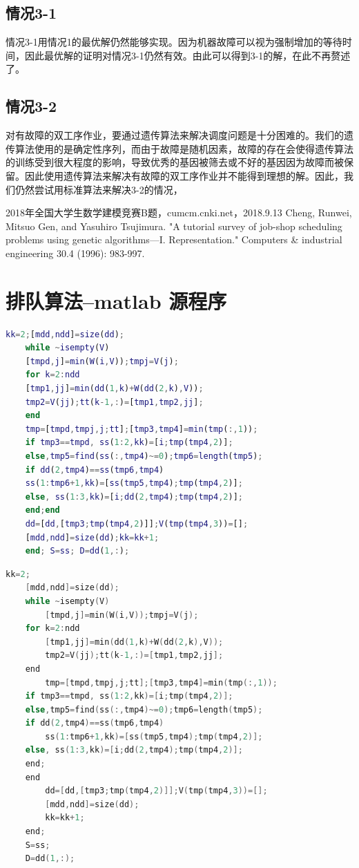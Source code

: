 \documentclass{cumcmthesis}
\begin{document}
	\subsection{情况3-1}
	情况3-1用情况1的最优解仍然能够实现。因为机器故障可以视为强制增加的等待时间，因此最优解的证明对情况3-1仍然有效。由此可以得到3-1的解，在此不再赘述了。
	\subsection{情况3-2}
	对有故障的双工序作业，要通过遗传算法来解决调度问题是十分困难的。我们的遗传算法使用的是确定性序列，而由于故障是随机因素，故障的存在会使得遗传算法的训练受到很大程度的影响，导致优秀的基因被筛去或不好的基因因为故障而被保留。因此使用遗传算法来解决有故障的双工序作业并不能得到理想的解。因此，我们仍然尝试用标准算法来解决3-2的情况，
	
	\begin{thebibliography}{9}
		 2018年全国大学生数学建模竞赛B题，cumcm.cnki.net，2018.9.13
		 Cheng, Runwei, Mitsuo Gen, and Yasuhiro Tsujimura. "A tutorial survey of job-shop scheduling problems using genetic algorithms—I. Representation." Computers \& industrial engineering 30.4 (1996): 983-997.
	\end{thebibliography}
	
	\newpage
	\appendix
	\section{排队算法--matlab 源程序}
	\begin{lstlisting}[language=matlab]
	kk=2;[mdd,ndd]=size(dd);
	while ~isempty(V)
	[tmpd,j]=min(W(i,V));tmpj=V(j);
	for k=2:ndd
	[tmp1,jj]=min(dd(1,k)+W(dd(2,k),V));
	tmp2=V(jj);tt(k-1,:)=[tmp1,tmp2,jj];
	end
	tmp=[tmpd,tmpj,j;tt];[tmp3,tmp4]=min(tmp(:,1));
	if tmp3==tmpd, ss(1:2,kk)=[i;tmp(tmp4,2)];
	else,tmp5=find(ss(:,tmp4)~=0);tmp6=length(tmp5);
	if dd(2,tmp4)==ss(tmp6,tmp4)
	ss(1:tmp6+1,kk)=[ss(tmp5,tmp4);tmp(tmp4,2)];
	else, ss(1:3,kk)=[i;dd(2,tmp4);tmp(tmp4,2)];
	end;end
	dd=[dd,[tmp3;tmp(tmp4,2)]];V(tmp(tmp4,3))=[];
	[mdd,ndd]=size(dd);kk=kk+1;
	end; S=ss; D=dd(1,:);
	 \end{lstlisting}
	\begin{lstlisting}[language=c]
	kk=2;
	[mdd,ndd]=size(dd);
	while ~isempty(V)
		[tmpd,j]=min(W(i,V));tmpj=V(j);
	for k=2:ndd
		[tmp1,jj]=min(dd(1,k)+W(dd(2,k),V));
		tmp2=V(jj);tt(k-1,:)=[tmp1,tmp2,jj];
	end
		tmp=[tmpd,tmpj,j;tt];[tmp3,tmp4]=min(tmp(:,1));
	if tmp3==tmpd, ss(1:2,kk)=[i;tmp(tmp4,2)];
	else,tmp5=find(ss(:,tmp4)~=0);tmp6=length(tmp5);
	if dd(2,tmp4)==ss(tmp6,tmp4)
		ss(1:tmp6+1,kk)=[ss(tmp5,tmp4);tmp(tmp4,2)];
	else, ss(1:3,kk)=[i;dd(2,tmp4);tmp(tmp4,2)];
	end;
	end
		dd=[dd,[tmp3;tmp(tmp4,2)]];V(tmp(tmp4,3))=[];
		[mdd,ndd]=size(dd);
		kk=kk+1;
	end;
	S=ss;
	D=dd(1,:);
	 \end{lstlisting}
	
	
	
\end{document}
